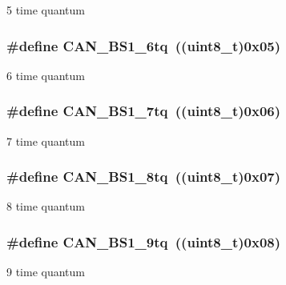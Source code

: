 \label{group__CAN__time__quantum__in__bit__segment__1_ga31dea95492dababfcf79bcaeb884b99e}
5 time quantum \hypertarget{group__CAN__time__quantum__in__bit__segment__1_gaa7fc6fcdf9c1c70ee9700b35e32e205e}{
\subsubsection[{CAN\_\-BS1\_\-6tq}]{\setlength{\rightskip}{0pt plus 5cm}\#define CAN\_\-BS1\_\-6tq~((uint8\_\-t)0x05)}}
\label{group__CAN__time__quantum__in__bit__segment__1_gaa7fc6fcdf9c1c70ee9700b35e32e205e}
6 time quantum \hypertarget{group__CAN__time__quantum__in__bit__segment__1_gafec90578d657073a671b6326f3bfcf8e}{
\subsubsection[{CAN\_\-BS1\_\-7tq}]{\setlength{\rightskip}{0pt plus 5cm}\#define CAN\_\-BS1\_\-7tq~((uint8\_\-t)0x06)}}
\label{group__CAN__time__quantum__in__bit__segment__1_gafec90578d657073a671b6326f3bfcf8e}
7 time quantum \hypertarget{group__CAN__time__quantum__in__bit__segment__1_ga1049ea9bc5b3da680574ca444e888de4}{
\subsubsection[{CAN\_\-BS1\_\-8tq}]{\setlength{\rightskip}{0pt plus 5cm}\#define CAN\_\-BS1\_\-8tq~((uint8\_\-t)0x07)}}
\label{group__CAN__time__quantum__in__bit__segment__1_ga1049ea9bc5b3da680574ca444e888de4}
8 time quantum \hypertarget{group__CAN__time__quantum__in__bit__segment__1_ga0493701bdd73a9649510f035439a6580}{
\subsubsection[{CAN\_\-BS1\_\-9tq}]{\setlength{\rightskip}{0pt plus 5cm}\#define CAN\_\-BS1\_\-9tq~((uint8\_\-t)0x08)}}
\label{group__CAN__time__quantum__in__bit__segment__1_ga0493701bdd73a9649510f035439a6580}
9 time quantum 